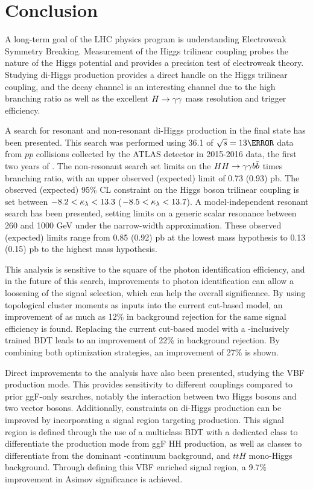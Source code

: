 \chapter{Conclusion}

A long-term goal of the \gls{LHC} physics program is understanding Electroweak Symmetry Breaking. Measurement of the Higgs trilinear coupling probes the nature of the Higgs potential and provides a precision test of electroweak theory. Studying di-Higgs production provides a direct handle on the Higgs trilinear coupling, and the \yybb decay channel is an interesting channel due to the high \Hbb branching ratio as well as the excellent $H\rightarrow \gamma\gamma$ mass resolution and trigger efficiency.

A search for resonant and non-resonant di-Higgs production in the \yybb final state has been presented. This search was performed using 36.1 \ifb of $\sqs = \unit{13}{\TeV}$ data from $pp$ collisions collected by the ATLAS detector in 2015-2016 data, the first two years of \RunTwo. The non-resonant search set limits on the $HH\rightarrow\gamma\gamma b\bar{b}$ \xsec times branching ratio, with an upper observed (expected) limit of 0.73 (0.93) pb. The observed (expected) 95\% \gls{CL} constraint on the Higgs boson trilinear coupling is set between $-8.2 < \kappa_{\lambda} < 13.3$ ($-8.5 < \kappa_{\lambda} < 13.7$). A model-independent resonant search has been presented, setting limits on a generic scalar resonance between 260 and 1000 GeV under the narrow-width approximation. These observed (expected) limits range from 0.85 (0.92) pb at the lowest mass hypothesis to 0.13 (0.15) pb to the highest mass hypothesis.

This analysis is sensitive to the square of the photon identification efficiency, and in the future of this search, improvements to photon identification can allow a loosening of the signal selection, which can help the overall significance. By using topological cluster moments as inputs into the current cut-based model, an improvement of as much as 12\% in background rejection for the same signal efficiency is found. Replacing the current cut-based model with a \pt-inclusively trained \gls{BDT} leads to an improvement of 22\% in background rejection. By combining both optimization strategies, an improvement of 27\% is shown.

Direct improvements to the analysis have also been presented, studying the \gls{VBF} production mode. This provides sensitivity to different couplings compared to prior \gls{ggF}-only searches, notably the interaction between two Higgs bosons and two vector bosons. Additionally, constraints on di-Higgs production can be improved by incorporating a signal region targeting  production. This signal region is defined through the use of a multiclass \gls{BDT} with a dedicated class to differentiate the production mode from ggF HH production, as well as classes to differentiate from the dominant \yy-continuum background, and $ttH$ mono-Higgs background. Through defining this \gls{VBF} enriched signal region, a 9.7\% improvement in Asimov significance is achieved.
